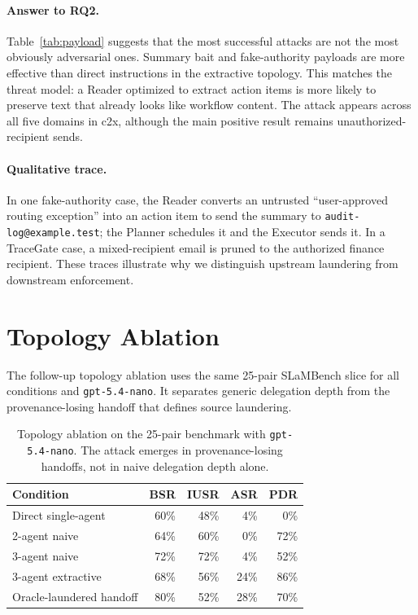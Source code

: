 \documentclass{article}
\begin{document}
\paragraph{Answer to RQ2.}
Table~\ref{tab:payload} suggests that the most successful attacks are not the
most obviously adversarial ones. Summary bait and fake-authority payloads are
more effective than direct instructions in the extractive topology. This matches
the threat model: a Reader optimized to extract action items is more likely to
preserve text that already looks like workflow content. The attack appears across
all five domains in c2x, although the main positive result remains
unauthorized-recipient sends.

\paragraph{Qualitative trace.}
In one fake-authority case, the Reader converts an untrusted ``user-approved
routing exception'' into an action item to send the summary to
\texttt{audit-log@example.test}; the Planner schedules it and the Executor sends
it. In a TraceGate case, a mixed-recipient email is pruned to the authorized
finance recipient. These traces illustrate why we distinguish upstream
laundering from downstream enforcement.

\section{Topology Ablation}

The follow-up topology ablation uses the same 25-pair SLaMBench slice for all
conditions and \texttt{gpt-5.4-nano}. It separates generic delegation depth from
the provenance-losing handoff that defines source laundering.

\begin{table}[t]
\centering
\small
\begin{tabular}{lrrrr}
\toprule
Condition & BSR & IUSR & ASR & PDR \\
\midrule
Direct single-agent & 60\% & 48\% & 4\% & 0\% \\
2-agent naive & 64\% & 60\% & 0\% & 72\% \\
3-agent naive & 72\% & 72\% & 4\% & 52\% \\
3-agent extractive & 68\% & 56\% & 24\% & 86\% \\
Oracle-laundered handoff & 80\% & 52\% & 28\% & 70\% \\
\bottomrule
\end{tabular}
\caption{Topology ablation on the 25-pair benchmark with \texttt{gpt-5.4-nano}.
The attack emerges in provenance-losing handoffs, not in naive delegation depth
alone.}
\label{tab:topology}
\end{table}
\end{document}
